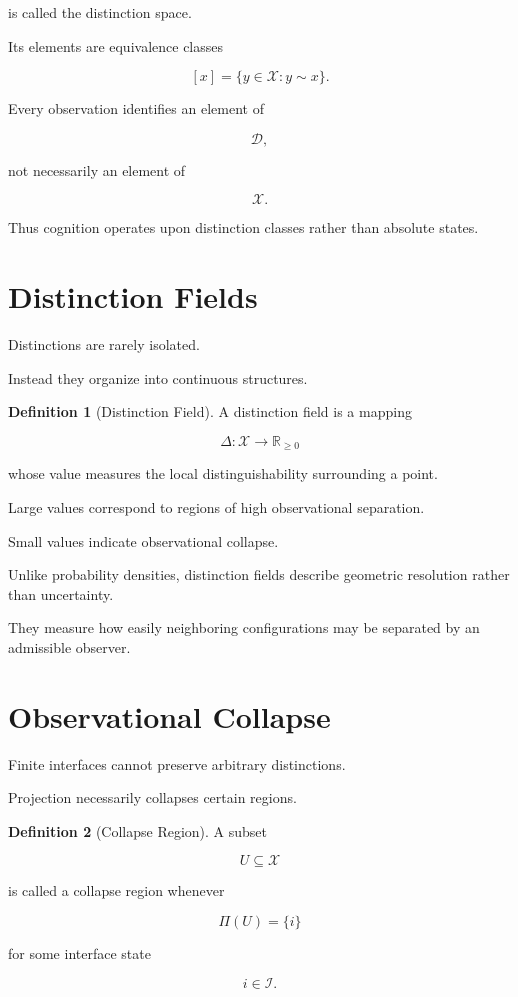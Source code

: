 \documentclass[11pt,oneside]{book}
\numberwithin{equation}{chapter}
\theoremstyle{definition}
\newtheorem{definition}{Definition}[chapter]
\theoremstyle{plain}
\begin{document}
is called the distinction space.

Its elements are equivalence classes

\[
[x]
=
\{
y\in\mathcal{X}
:
y\sim x
\}.
\]

Every observation identifies an element of

\[
\mathcal{D},
\]

not necessarily an element of

\[
\mathcal{X}.
\]

Thus cognition operates upon distinction classes rather than absolute states.

\section{Distinction Fields}

Distinctions are rarely isolated.

Instead they organize into continuous structures.

\begin{definition}[Distinction Field]

A distinction field is a mapping

\[
\Delta:
\mathcal{X}
\rightarrow
\mathbb{R}_{\ge0}
\]

whose value measures the local distinguishability surrounding a point.

Large values correspond to regions of high observational separation.

Small values indicate observational collapse.

\end{definition}

Unlike probability densities, distinction fields describe geometric
resolution rather than uncertainty.

They measure how easily neighboring configurations may be separated by an
admissible observer.

\section{Observational Collapse}

Finite interfaces cannot preserve arbitrary distinctions.

Projection necessarily collapses certain regions.

\begin{definition}[Collapse Region]

A subset

\[
U
\subseteq
\mathcal{X}
\]

is called a collapse region whenever

\[
\Pi(U)
=
\{i\}
\]

for some interface state

\[
i
\in
\mathcal{I}.
\]

\end{definition}
\end{document}
